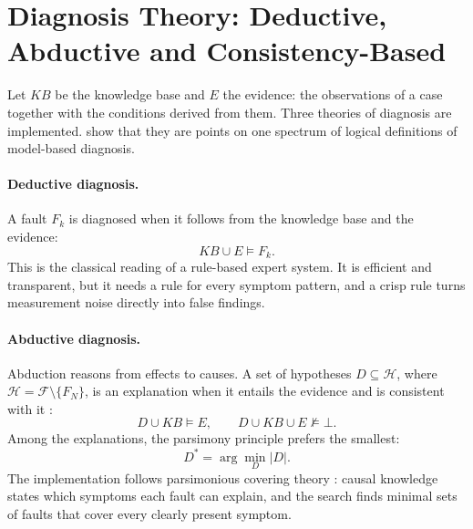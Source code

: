 \section{Diagnosis Theory: Deductive, Abductive and Consistency-Based}
\label{sec:diagnosis-theory}

Let $\mathit{KB}$ be the knowledge base and $E$ the evidence: the observations of a case together with the conditions derived from them. Three theories of diagnosis are implemented. \textcite{console1991} show that they are points on one spectrum of logical definitions of model-based diagnosis.

\paragraph{Deductive diagnosis.} A fault $F_k$ is diagnosed when it follows from the knowledge base and the evidence:
\begin{equation}
  \mathit{KB} \cup E \models F_k .
  \label{eq:deductive}
\end{equation}
This is the classical reading of a rule-based expert system. It is efficient and transparent, but it needs a rule for every symptom pattern, and a crisp rule turns measurement noise directly into false findings.

\paragraph{Abductive diagnosis.} Abduction reasons from effects to causes. A set of hypotheses $D \subseteq \mathcal{H}$, where $\mathcal{H} = \mathcal{F} \setminus \{F_N\}$, is an explanation when it entails the evidence and is consistent with it \parencite{poole1989}:
\begin{equation}
  D \cup \mathit{KB} \models E, \qquad D \cup \mathit{KB} \cup E \not\models \bot .
  \label{eq:abductive}
\end{equation}
Among the explanations, the parsimony principle prefers the smallest:
\begin{equation}
  D^{*} = \arg\min_{D} \lvert D \rvert .
  \label{eq:parsimony}
\end{equation}
The implementation follows parsimonious covering theory \parencite{peng1990}: causal knowledge states which symptoms each fault can explain, and the search finds minimal sets of faults that cover every clearly present symptom.

